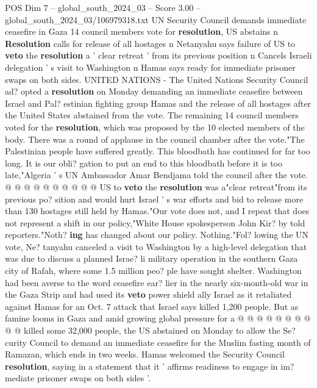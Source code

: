 \begin{textsample}{POS Dim 7 – global\_south\_2024\_03 – Score 3.00 – global\_south\_2024\_03/106979318.txt}  \label{ex:f7_pos_025}
UN Security Council demands immediate ceasefire in Gaza 14 council members vote for \textbf{resolution}, US abstains n \textbf{Resolution} calls for release of all hostages n Netanyahu says failure of US to \textbf{veto} the \textbf{resolution} a ' clear retreat ' from its previous position n Cancels Israeli delegation ' s visit to Washington n Hamas says ready for immediate prisoner swaps on both sides.
UNITED NATIONS - The United Nations Security Council ad? opted a \textbf{resolution} on Monday demanding an immediate ceasefire between Israel and Pal? estinian fighting group Hamas and the release of all hostages after the United States abstained from the vote.
The remaining 14 council members voted for the \textbf{resolution}, which was proposed by the 10 elected members of the body.
There was a round of applause in the council chamber after the vote."The Palestinian people have suffered greatly.
This bloodbath has continued for far too long.
It is our obli? gation to put an end to this bloodbath before it is too late,"Algeria ' s UN Ambassador Amar Bendjama told the council after the vote. @ @ @ @ @ @ @ @ @ @ US to \textbf{veto} the \textbf{resolution} was a"clear retreat"from its previous po? sition and would hurt Israel ' s war efforts and bid to release more than 130 hostages still held by Hamas."Our vote does not, and I repeat that does not represent a shift in our policy,"White House spokesperson John Kir? by told reporters."Noth? \textbf{ing} has changed about our policy.
Nothing."Fol? lowing the UN vote, Ne? tanyahu canceled a visit to Washington by a high-level delegation that was due to discuss a planned Israe? li military operation in the southern Gaza city of Rafah, where some 1.5 million peo? ple have sought shelter.
Washington had been averse to the word ceasefire ear? lier in the nearly six-month-old war in the Gaza Strip and had used its \textbf{veto} power shield ally Israel as it retaliated against Hamas for an Oct. 7 attack that Israel says killed 1,200 people.
But as famine looms in Gaza and amid growing global pressure for a @ @ @ @ @ @ @ @ @ @ killed some 32,000 people, the US abstained on Monday to allow the Se? curity Council to demand an immediate ceasefire for the Muslim fasting month of Ramazan, which ends in two weeks.
Hamas welcomed the Security Council \textbf{resolution}, saying in a statement that it ' affirms readiness to engage in im? mediate prisoner swaps on both sides '.

\end{textsample}
